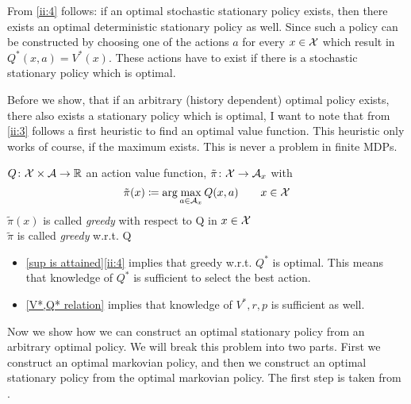 \begin{remark}\label{opt stat => opt det stat}
	From \ref{ii:4} follows: if an optimal stochastic stationary policy exists, then there exists an optimal deterministic stationary policy as well. Since such a policy can be constructed by choosing one of the actions \(a\) for every \(x\in\mathcal{X}\) which result in \(Q^*(x,a)=V^*(x)\). These actions have to exist if there is a stochastic stationary policy which is optimal.
\end{remark}
	Before we show, that if an arbitrary (history dependent) optimal policy exists, there also exists a stationary policy which is optimal, I want to note that from \ref{ii:3} follows a first heuristic to find an optimal value function. This heuristic only works of course, if the maximum exists. This is never a problem in finite MDPs. 
\begin{definition}
	\(Q\colon\mathcal{X}\times\mathcal{A}\to\mathbb{R}\) an action value function, \(\tilde{\pi}\colon\mathcal{X}\to\mathcal{A}_x\) with
	\[
	\tilde{\pi}(x)\coloneqq\arg\max_{a\in\mathcal{A}_x} Q(x,a)\qquad x\in\mathcal{X}
	\]
	\(\tilde{\pi}(x)\) is called \emph{greedy} with respect to Q in \(x\in\mathcal{X}\)\\
	\(\tilde{\pi}\) is called \emph{greedy} w.r.t. Q
\end{definition}

\begin{remark}\leavevmode
	\begin{itemize}
	\item \ref{sup is attained}\ref{ii:4} implies that greedy w.r.t. \(Q^*\) is optimal. 
	This means that knowledge of \(Q^*\) is sufficient to select the best action.
	\item \ref{V*,Q* relation} implies that knowledge of \(V^*,r,p\) is sufficient as well.
	\end{itemize}
\end{remark}

Now we show how we can construct an optimal stationary policy from an arbitrary optimal policy. We will break this problem into two parts. First we construct an optimal markovian policy, and then we construct an optimal stationary policy from the optimal markovian policy. The first step is taken from \textcite[134-137]{putermanMarkovDecisionProcesses2005}.

